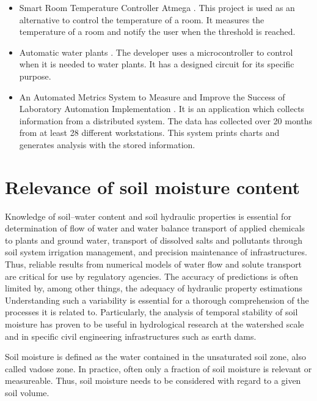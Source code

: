 \begin{itemize}

\item Smart Room Temperature Controller Atmega \cite{smart_room_controller}. This project is used as an alternative to control the temperature of a room. It measures the temperature of a room and notify the user when the threshold is reached.

\item Automatic water plants \cite{diy_blokefollow_watering_nodate}. The developer uses a microcontroller to control when it is needed to water plants. It has a designed circuit for its specific purpose.

\item An Automated Metrics System to Measure and Improve the Success of Laboratory Automation Implementation \cite{benn_automated_2006}. It is an application which collects information from a distributed system. The data has collected over 20 months from at least 28 different workstations. This system prints charts and generates analysis with the stored information.

\end{itemize}

\section{Relevance of soil moisture content}

Knowledge of soil–water content and soil hydraulic properties is essential for determination of flow of water and water balance transport of applied chemicals to plants and ground water, transport of dissolved salts and  pollutants through soil system irrigation management, and precision  maintenance of infrastructures. Thus, reliable results from numerical models of water flow and solute transport are critical for use by regulatory agencies. The accuracy of predictions is often limited by, among other things, the adequacy of hydraulic property estimations   Understanding such a variability is essential for a thorough comprehension of the processes it is related to.  Particularly, the analysis of temporal stability of soil moisture has proven to be useful in hydrological research at the watershed scale and in specific civil engineering infrastructures such as earth dams. 

Soil moisture is defined as the water contained in the unsaturated soil zone, also called vadose zone. In practice, often only a fraction of soil moisture is relevant or measureable. Thus, soil moisture needs to be considered with regard to a given soil volume.

